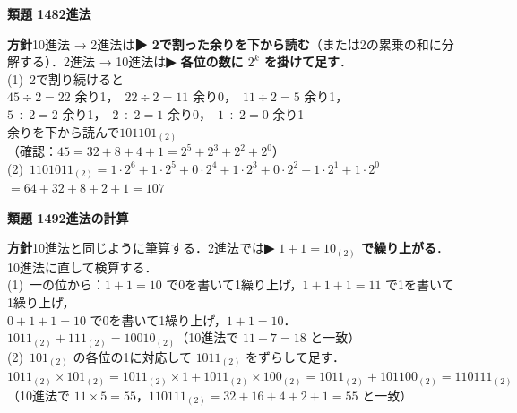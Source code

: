 \documentclass[a4paper,11pt]{ltjsarticle}
\newcommand{\ans}[2]{\Needspace{5\baselineskip}\vspace{6pt}%
  {\sffamily\bfseries 類題 #1\quad #2}\par}
\newcommand{\point}[1]{\textsf{\bfseries ▶ #1}}
\begin{document}
\ans{148}{2進法}
\begin{kai}
\textbf{方針}\quad 10進法 → 2進法は\point{2で割った余りを下から読む}（または2の累乗の和に分解する）．2進法 → 10進法は\point{各位の数に $2^k$ を掛けて足す}．\\[2pt]
(1)\ 2で割り続けると\\
\hspace*{1.5em}$45\div2=22$ 余り1，\ $22\div2=11$ 余り0，\ $11\div2=5$ 余り1，\\
\hspace*{1.5em}$5\div2=2$ 余り1，\ $2\div2=1$ 余り0，\ $1\div2=0$ 余り1\\
\hspace*{1.5em}余りを下から読んで\quad $101101_{(2)}$\\
\hspace*{1.5em}（確認：$45=32+8+4+1=2^5+2^3+2^2+2^0$）\\[2pt]
(2)\ $1101011_{(2)}=1\cdot2^6+1\cdot2^5+0\cdot2^4+1\cdot2^3+0\cdot2^2+1\cdot2^1+1\cdot2^0$\\
\hspace*{1.5em}$=64+32+8+2+1=107$
\end{kai}

\ans{149}{2進法の計算}
\begin{kai}
\textbf{方針}\quad 10進法と同じように筆算する．2進法では\point{$1+1=10_{(2)}$ で繰り上がる}．10進法に直して検算する．\\[2pt]
(1)\ 一の位から：$1+1=10$ で0を書いて1繰り上げ，$1+1+1=11$ で1を書いて1繰り上げ，\\
\hspace*{1.5em}$0+1+1=10$ で0を書いて1繰り上げ，$1+1=10$．\\
\hspace*{1.5em}$1011_{(2)}+111_{(2)}=10010_{(2)}$\quad（10進法で $11+7=18$ と一致）\\[2pt]
(2)\ $101_{(2)}$ の各位の1に対応して $1011_{(2)}$ をずらして足す．\\
\hspace*{1.5em}$1011_{(2)}\times101_{(2)}=1011_{(2)}\times1+1011_{(2)}\times100_{(2)}=1011_{(2)}+101100_{(2)}=110111_{(2)}$\\
\hspace*{1.5em}（10進法で $11\times5=55$，$110111_{(2)}=32+16+4+2+1=55$ と一致）
\end{kai}
\end{document}
